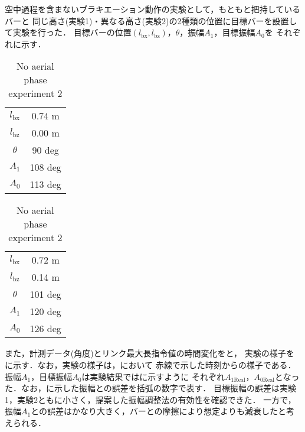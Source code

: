         空中過程を含まないブラキエーション動作の実験として，もともと把持しているバーと
        同じ高さ(実験1)・異なる高さ(実験2)の2種類の位置に目標バーを設置して実験を行った．
        目標バーの位置$(l_{\mathrm{bx}},l_{\mathrm{bz}})$，$\theta$，振幅$A_1$，目標振幅$A_0$を
        それぞれに示す．
        \begin{table}[t]
                \begin{minipage}[c]{0.5\hsize}
                  \centering
                  \caption{No aerial phase experiment 1}
                  \vspace{2mm}
                  \begin{tabular}{c|c}
                    \hline
                    $l_{\mathrm{bx}}$ & 0.74 m \\
                    $l_{\mathrm{bz}}$ & 0.00 m \\
                    $\theta$ & 90 deg \\ 
                    $A_1$ & 108 deg \\
                    $A_0$ & 113 deg \\
                    \hline
                  \end{tabular}
                \end{minipage}
                \begin{minipage}[c]{0.5\hsize}
                  \centering
                  \caption{No aerial phase experiment 2}
                  \vspace{2mm}
                  \begin{tabular}{c|c}
                    \hline
                    $l_{\mathrm{bx}}$ & 0.72 m \\
                    $l_{\mathrm{bz}}$ & 0.14 m \\
                    $\theta$ & 101 deg \\ 
                    $A_1$ & 120 deg \\
                    $A_0$ & 126 deg \\
                    \hline
                  \end{tabular}
                \end{minipage}
              \end{table}
        また，計測データ(角度)とリンク最大長指令値の時間変化をと，
        実験の様子をに示す．なお，実験の様子は，において
        赤線で示した時刻からの様子である．振幅$A_1$，目標振幅$A_0$は実験結果ではに示すように
        それぞれ$A_{\mathrm{1Real}}$，$A_{\mathrm{0Real}}$となった．なお，に示した振幅との誤差を括弧の数字で表す．
        目標振幅の誤差は実験1，実験2ともに小さく，提案した振幅調整法の有効性を確認できた．
        一方で，振幅$A_1$との誤差はかなり大きく，バーとの摩擦により想定よりも減衰したと考えられる．
        
